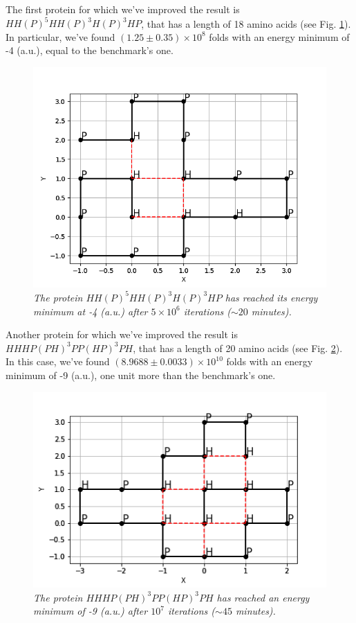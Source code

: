 The first protein for which we've improved the result is $HH(P)^5HH(P)^3H(P)^3HP$, that has a length of 18 amino acids (see Fig. \ref{fig:18_1}).
In particular, we've found $(1.25 \pm 0.35) \times 10^8$ folds with an energy minimum of -4 (a.u.), equal to the benchmark's one.
\begin{figure}[H]
    \centering
    \includegraphics[width=.75\textwidth]{./img/18_1.png}
    \caption{\emph{The protein $HH(P)^5HH(P)^3H(P)^3HP$ has reached its energy minimum at -4 (a.u.) after $5 \times 10^6$ iterations ($\sim 20$ minutes).}}
    \label{fig:18_1}
\end{figure}
Another protein for which we've improved the result is $HHHP(PH)^3PP(HP)^3PH$, that has a length of 20 amino acids (see Fig. \ref{fig:20_2}).
In this case, we've found $(8.9688 \pm 0.0033) \times 10^{10}$ folds with an energy minimum of -9 (a.u.), one unit more than the benchmark's one.
\begin{figure}[H]
    \centering
    \includegraphics[width=.75\textwidth]{./img/20_2.png}
    \caption{\emph{The protein $HHHP(PH)^3PP(HP)^3PH$ has reached an energy minimum of -9 (a.u.) after $10^7$ iterations ($\sim 45$ minutes).}}
    \label{fig:20_2}
\end{figure}
